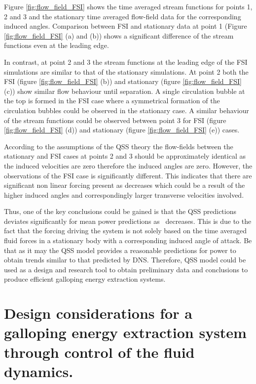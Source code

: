 

Figure \ref{fig:flow_field_FSI} shows the time averaged stream functions for points 1, 2 and 3 and the stationary time averaged flow-field data for the corresponding induced angles. Comparison between FSI and stationary data at point 1 (Figure \ref{fig:flow_field_FSI} (a) and (b)) shows a significant difference of the stream functions even at the leading edge.

In contrast, at point 2 and 3 the stream functions at the leading edge of the FSI simulations are similar to that of the stationary simulations. At point 2 both the FSI (figure \ref{fig:flow_field_FSI} (b)) and stationary (figure \ref{fig:flow_field_FSI} (c)) show similar flow behaviour until separation. A single circulation bubble at the top is formed in the FSI case where a symmetrical formation of the circulation bubbles could be observed in the stationary case. A similar behaviour of the stream functions could be observed between point 3 for FSI (figure \ref{fig:flow_field_FSI} (d)) and stationary (figure \ref{fig:flow_field_FSI} (e)) cases. 

According to the assumptions of the QSS theory the flow-fields between the stationary and FSI cases at points 2 and 3 should be approximately identical as the induced velocities are zero therefore the induced angles are zero. However, the observations of the FSI case is significantly different. This indicates that there are significant non linear forcing present as \ratio decreases which could be a result of the higher induced angles and correspondingly larger transverse velocities involved. 

Thus, one of the key conclusions could be gained is that the QSS predictions deviates significantly for mean power predictions as \ratio\ decreases. This is due to the fact that the forcing driving the system is not solely based on the time averaged fluid forces in a stationary body with a corresponding induced angle of attack. Be that as it may the QSS model provides a reasonable predictions for power to obtain trends similar to that predicted by DNS. Therefore, QSS model could be used as a design and research tool to obtain preliminary data and conclusions to produce efficient galloping energy extraction systems. 

\section{Design considerations for a galloping energy extraction system through control of the fluid dynamics.}
\label{subsec:design-considerations-cross-section}
  
